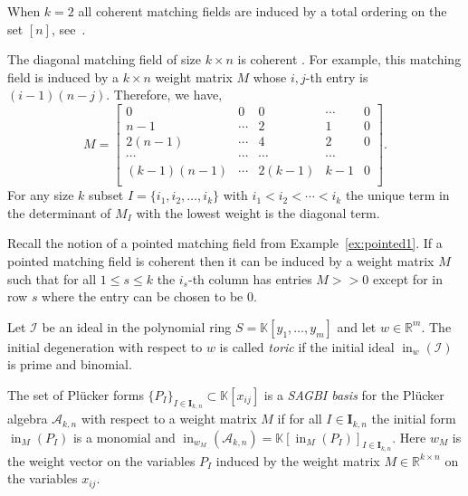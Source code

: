 \documentclass[ALCO,ThmDefs,Unicode,epreuves]{cedram}
\DeclareMathOperator{\ini}{in}
\newcommand{\I}{\mathcal{I}}
\begin{document}
\begin{exam}
When $k = 2$ all coherent matching fields are induced by a total ordering on the set $[n]$, see~\cite[Proposition~1.11]{sturmfels1993maximal}. 
\end{exam}

\begin{exam}\label{ex:diagonal2}
The diagonal matching field of size $k \times n$ is coherent 
\cite[Example~1.3]{sturmfels1993maximal}.
For example, this matching field is induced by a $k\times n$ weight matrix $M$ whose $i,j$-th entry 
is $(i-1)(n-j)$. Therefore, we have, 
\[
M=\begin{bmatrix}
 0 & 0 & 0 & \cdots & 0 \\
 n-1 &\cdots & 2 & 1 & 0 \\
 2(n-1) &\cdots & 4 & 2 & 0 \\
 \cdots & \cdots & \cdots & \cdots \\
 (k-1)(n-1)& \cdots & 2(k-1) & k-1 & 0 \\
\end{bmatrix}.
\]
For any size $k$ subset $I=\{i_1,i_2,\ldots,i_k\}$ with $i_1<i_2<\cdots<i_k$ the unique term in the determinant of $M_I$ with the lowest weight is the diagonal term. 
\end{exam}

\begin{exam}\label{ex:pointed2}
Recall the notion of a pointed matching field from Example~\ref{ex:pointed1}. If a pointed matching field is coherent then it can be induced by a weight matrix $M$ such that for all $1 \leq s \leq k$ the $i_s$-th column has entries $M >\!\!>0 $ except for in row $s$ where the entry can be chosen to be $0$. 
\end{exam}



\begin{Definition}\label{def:toric}
Let $\I$ be an ideal in the polynomial ring $S = \mathbb{K}[y_1, \ldots, y_m]$ and let $w \in \mathbb{R}^m$. 
The initial degeneration with respect to $w$ is called \emph{toric} if the initial ideal $\ini_w(\I)$ is prime and binomial. 
\end{Definition}

\begin{Definition}\label{def:Khovanskii}
The set of Pl{\"u}cker forms $\{P_I\}_{I\in \mathbf{I}_{k,n}}\subset \mathbb{K}[x_{ij}]$ is a \emph{SAGBI basis} for the Pl{\"u}cker algebra $\mathcal{A}_{k,n}$ with respect to a weight matrix $M$ 
if for all $I \in \mathbf{I}_{k,n} $ the initial form $\ini_M(P_I) $ is a monomial and 
$\ini_{w_M}(\mathcal{A}_{k,n})=\mathbb{K}[\ini_M(P_I)]_{I \in \mathbf{I}_{k,n}}$. Here $w_M$ is the weight vector on the variables $P_I$ induced by the weight matrix $M\in\mathbb{R}^{k\times n}$ on the variables $x_{ij}$. 

\end{Definition}
\end{document}
